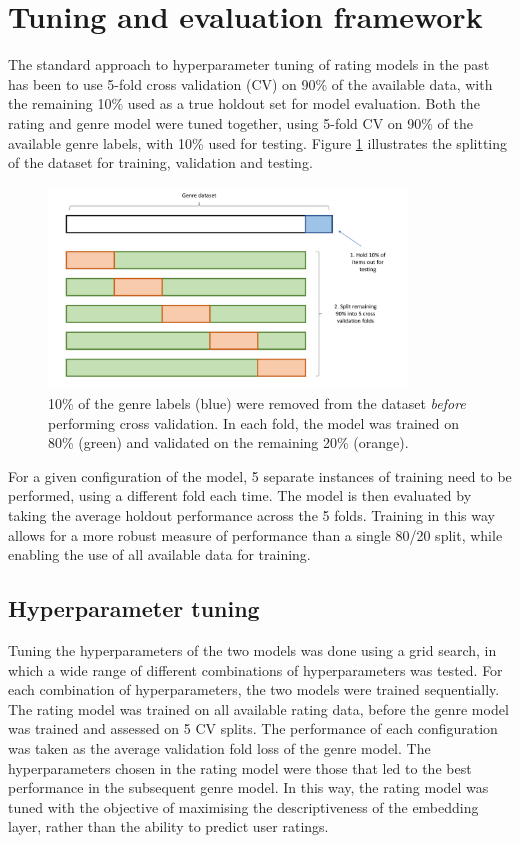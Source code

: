 \section{Tuning and evaluation framework}
The standard approach to hyperparameter tuning of rating models in the past has been to use 5-fold cross validation (CV) on 90\% of the available data, with the remaining 10\% used as a true holdout set for model evaluation. Both the rating and genre model were tuned together, using 5-fold CV on 90\% of the available genre labels, with 10\% used for testing. Figure \ref{fig:4_cross-validation} illustrates the splitting of the dataset for training, validation and testing.

\begin{figure}[H]
\centering
\includegraphics[width=0.85\textwidth]{Figures/4_cross-validation-2.pdf}
\decoRule
\caption[Holdout set]{10\% of the genre labels (blue) were removed from the dataset \textit{before} performing cross validation. In each fold, the model was trained on 80\% (green) and validated on the remaining 20\% (orange).}
\label{fig:4_cross-validation}
\end{figure}

For a given configuration of the model, 5 separate instances of training need to be performed, using a different fold each time. The model is then evaluated by taking the average holdout performance across the 5 folds. Training in this way allows for a more robust measure of performance than a single 80/20 split, while enabling the use of all available data for training.

\subsection{Hyperparameter tuning}
Tuning the hyperparameters of the two models was done using a grid search, in which a wide range of different combinations of hyperparameters was tested. For each combination of hyperparameters, the two models were trained sequentially. The rating model was trained on all available rating data, before the genre model was trained and assessed on 5 CV splits. The performance of each configuration was taken as the average validation fold loss of the genre model. The hyperparameters chosen in the rating model were those that led to the best performance in the subsequent genre model. In this way, the rating model was tuned with the objective of maximising the descriptiveness of the embedding layer, rather than the ability to predict user ratings.

